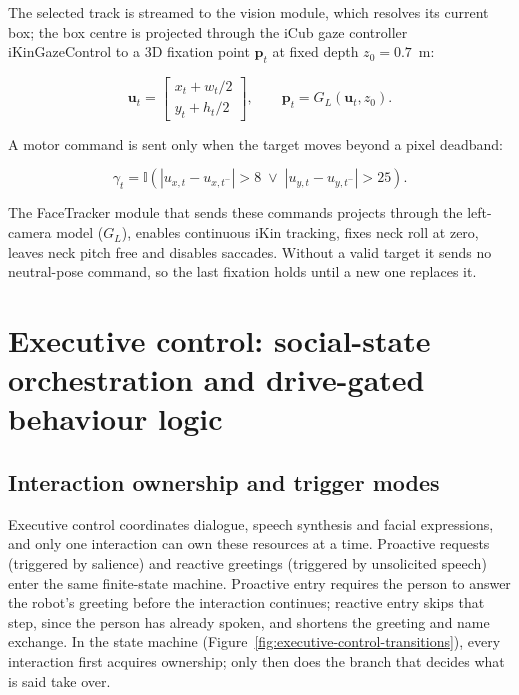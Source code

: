 The selected track is streamed to the vision module, which resolves its current box; the box centre is projected through the iCub gaze controller iKin\-Gaze\-Control to a 3D fixation point $\mathbf{p}_t$ at fixed depth $z_0=0.7$~m:

\begin{equation}
    \mathbf{u}_t=\begin{bmatrix} x_t+w_t/2\\y_t+h_t/2 \end{bmatrix}, \qquad \mathbf{p}_t=G_L(\mathbf{u}_t,z_0).
    \label{eq:facetracker-projection}
\end{equation}

A motor command is sent only when the target moves beyond a pixel deadband:

\begin{equation}
    \gamma_t = \mathbb{I}\!\left(|u_{x,t}-u_{x,t^-}|>8 \;\lor\; |u_{y,t}-u_{y,t^-}|>25\right).
    \label{eq:facetracker-deadband}
\end{equation}

The FaceTracker module that sends these commands projects through the left-camera model ($G_L$), enables continuous iKin tracking, fixes neck roll at zero, leaves neck pitch free and disables saccades. Without a valid target it sends no neutral-pose command, so the last fixation holds until a new one replaces it.

\section{Executive control: social-state orchestration and drive-gated behaviour logic}
\label{sec:executive-control}

\subsection{Interaction ownership and trigger modes}
\label{subsec:interaction-ownership}

Executive control coordinates dialogue, speech synthesis and facial expressions, and only one interaction can own these resources at a time. Proactive requests (triggered by salience) and reactive greetings (triggered by unsolicited speech) enter the same finite-state machine. Proactive entry requires the person to answer the robot's greeting before the interaction continues; reactive entry skips that step, since the person has already spoken, and shortens the greeting and name exchange. In the state machine (Figure~\ref{fig:executive-control-transitions}), every interaction first acquires ownership; only then does the branch that decides what is said take over.

